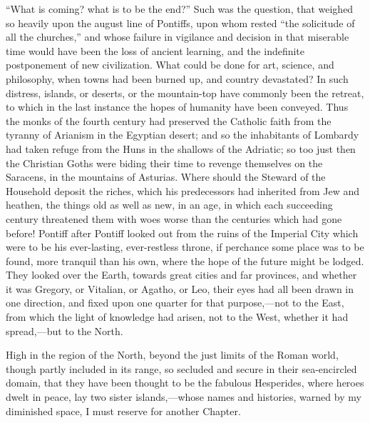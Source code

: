 ``What is coming? what is to be the end?'' Such was the
question, that weighed so heavily upon the august line of Pontiffs,
upon whom rested ``the solicitude of all the churches,'' and
whose failure in vigilance and decision in that miserable time would
have been the loss of ancient learning, and the indefinite postponement
of new civilization. What could be done for art, science, and
philosophy, when towns had been burned up, and country devastated? In
such distress, islands, or deserts, or the mountain-top have commonly
been the retreat, to which in the last instance the hopes of humanity
have been conveyed. Thus the monks of the fourth century had preserved
the Catholic faith from the tyranny of Arianism in the Egyptian
desert; and so the inhabitants of Lombardy had taken refuge from the
Huns in the shallows of the Adriatic; so too just then the Christian
Goths were biding their time to revenge themselves on the Saracens, in
the mountains of Asturias. Where should the Steward of the Household
deposit the riches, which his predecessors had inherited from Jew and
heathen, the things old as well as new, in an age, in which each
succeeding century threatened them with woes worse than the centuries
which had gone before! Pontiff after Pontiff looked out from the ruins
of the Imperial City which were to be his ever-lasting,
ever-restless throne, if perchance some place was to be found, more
tranquil than his own, where the hope of the future might be lodged.
They looked over the Earth, towards great cities and far provinces,
and whether it was Gregory, or Vitalian, or Agatho, or Leo, their eyes
had all been drawn in one direction, and fixed upon one quarter for
that purpose,—not to the East, from which the light of knowledge had
arisen, not to the West, whether it had spread,—but to the North.

High in the region of the North, beyond the just limits of the
Roman world, though partly included in its range, so secluded and
secure in their sea-encircled domain, that they have been thought to
be the fabulous Hesperides, where heroes dwelt in peace, lay two
sister islands,—whose names and histories, warned by my diminished
space, I must reserve for another Chapter.


